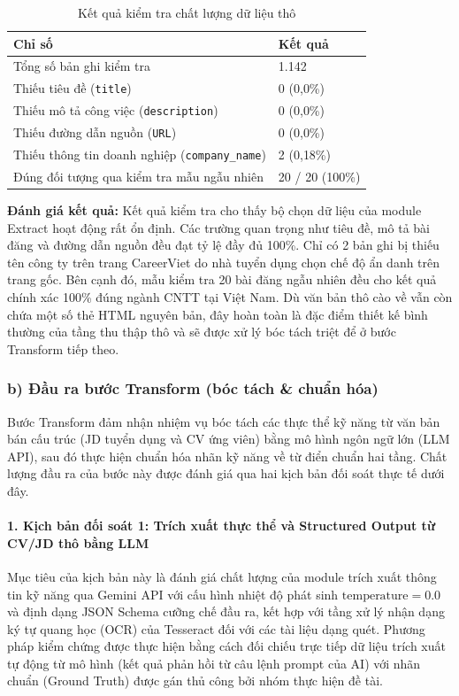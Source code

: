 \begin{table}[H]
\caption{Kết quả kiểm tra chất lượng dữ liệu thô}
\label{tab:extract_quality}
\centering
\begin{tabular}{|L{7.0cm}|C{3.0cm}|}
\hline
\textbf{Chỉ số} & \textbf{Kết quả} \\
\hline
Tổng số bản ghi kiểm tra & 1.142 \\
\hline
Thiếu tiêu đề (\texttt{title}) & 0 (0{,}0\%) \\
\hline
Thiếu mô tả công việc (\texttt{description}) & 0 (0{,}0\%) \\
\hline
Thiếu đường dẫn nguồn (\texttt{URL}) & 0 (0{,}0\%) \\
\hline
Thiếu thông tin doanh nghiệp (\texttt{company\_name}) & 2 (0{,}18\%) \\
\hline
Đúng đối tượng qua kiểm tra mẫu ngẫu nhiên & 20 / 20 (100\%) \\
\hline
\end{tabular}
\end{table}
\textbf{Đánh giá kết quả:}
Kết quả kiểm tra cho thấy bộ chọn dữ liệu của module Extract hoạt động rất ổn định. Các trường quan trọng như tiêu đề, mô tả bài đăng và đường dẫn nguồn đều đạt tỷ lệ đầy đủ 100\%. Chỉ có 2 bản ghi bị thiếu tên công ty trên trang CareerViet do nhà tuyển dụng chọn chế độ ẩn danh trên trang gốc. Bên cạnh đó, mẫu kiểm tra 20 bài đăng ngẫu nhiên đều cho kết quả chính xác 100\% đúng ngành CNTT tại Việt Nam. Dù văn bản thô cào về vẫn còn chứa một số thẻ HTML nguyên bản, đây hoàn toàn là đặc điểm thiết kế bình thường của tầng thu thập thô và sẽ được xử lý bóc tách triệt để ở bước Transform tiếp theo.
\subsubsection*{b) Đầu ra bước Transform (bóc tách \& chuẩn hóa)}
\label{subsubsec:etl_transform}

Bước Transform đảm nhận nhiệm vụ bóc tách các thực thể kỹ năng từ văn bản bán cấu trúc (JD tuyển dụng và CV ứng viên) bằng mô hình ngôn ngữ lớn (LLM API), sau đó thực hiện chuẩn hóa nhãn kỹ năng về từ điển chuẩn hai tầng. Chất lượng đầu ra của bước này được đánh giá qua hai kịch bản đối soát thực tế dưới đây.
\paragraph*{1. Kịch bản đối soát 1: Trích xuất thực thể và Structured Output từ CV/JD thô bằng LLM}
Mục tiêu của kịch bản này là đánh giá chất lượng của module trích xuất thông tin kỹ năng qua Gemini API với cấu hình nhiệt độ phát sinh $\text{temperature} = 0.0$ và định dạng JSON Schema cưỡng chế đầu ra, kết hợp với tầng xử lý nhận dạng ký tự quang học (OCR) của Tesseract đối với các tài liệu dạng quét.
Phương pháp kiểm chứng được thực hiện bằng cách đối chiếu trực tiếp dữ liệu trích xuất tự động từ mô hình (kết quả phản hồi từ câu lệnh prompt của AI) với nhãn chuẩn (Ground Truth) được gán thủ công bởi nhóm thực hiện đề tài.

